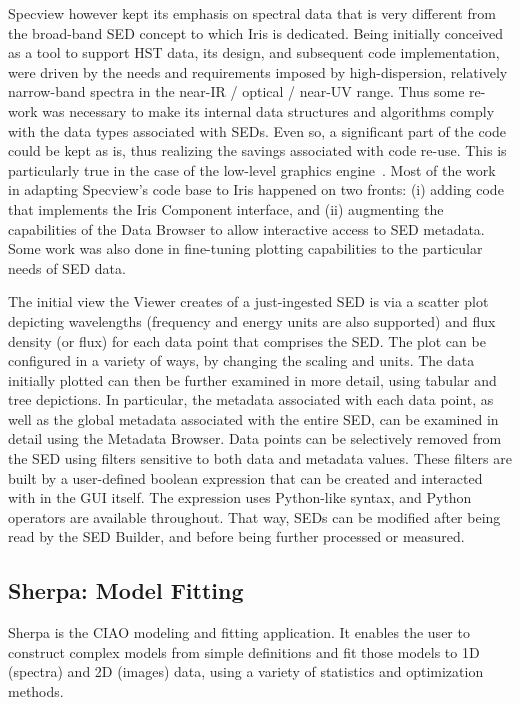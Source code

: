 \documentclass[final,5p]{elsarticle}
\begin{document}
Specview however kept its emphasis on spectral data that is very different from the broad-band SED concept to which Iris is dedicated. Being initially conceived as a tool to support HST data, its design, and subsequent code implementation, were driven by the needs and requirements imposed by high-dispersion, relatively narrow-band spectra in the near-IR / optical / near-UV range. Thus some re-work was necessary to make its internal data structures and algorithms comply with the data types associated with SEDs. Even so, a significant part of the code could be kept as is, thus realizing the savings associated with code re-use. This is particularly true in the case of the low-level graphics engine~\citep{2000ASPC..216...79B}. Most of the work in adapting Specview's code base to Iris happened on two fronts: (i) adding code that implements the Iris Component interface, and (ii) augmenting the capabilities of the Data Browser to allow interactive access to SED metadata. Some work was also done in fine-tuning plotting capabilities to the particular needs of SED data.

The initial view the Viewer creates of a just-ingested SED is via a scatter plot depicting wavelengths (frequency and energy units are also supported) and flux density (or flux) for each data point that comprises the SED. The plot can be configured in a variety of ways, by changing the scaling and units. The data initially plotted can then be further examined in more detail, using tabular and tree depictions. In particular, the metadata associated with each data point, as well as the global metadata associated with the entire SED, can be examined in detail using the Metadata Browser. Data points can be selectively removed from the SED using filters sensitive to both data and metadata values. These filters are built by a user-defined boolean expression that can be created and interacted with in the GUI itself. The expression uses Python-like syntax, and Python operators are available throughout. That way, SEDs can be modified after being read by the SED Builder, and before being further processed or measured.

\subsection{Sherpa: Model Fitting}
\label{subsec:sherpa}
Sherpa is the CIAO modeling and fitting application. It enables the user to construct complex models from simple definitions and fit those models to 1D (spectra) and 2D (images) data, using a variety of statistics and optimization methods.
\end{document}
